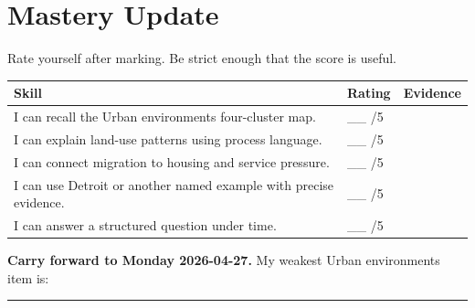 \documentclass[11pt,a4paper]{article}
\begin{document}
\section{Mastery Update}

Rate yourself after marking. Be strict enough that the score is useful.

\begin{tabularx}{\textwidth}{Y L{0.15\textwidth}Y}
\toprule
\textbf{Skill} & \textbf{Rating} & \textbf{Evidence} \\
\midrule
I can recall the Urban environments four-cluster map. & \_\_ /5 & \\
I can explain land-use patterns using process language. & \_\_ /5 & \\
I can connect migration to housing and service pressure. & \_\_ /5 & \\
I can use Detroit or another named example with precise evidence. & \_\_ /5 & \\
I can answer a structured question under time. & \_\_ /5 & \\
\bottomrule
\end{tabularx}

\vspace{0.7em}

\noindent\colorbox{SoftGreen}{%
\begin{minipage}{0.965\textwidth}
\sffamily\raggedright
\textbf{\textcolor{HeadingBlue}{Carry forward to Monday 2026-04-27.}}
My weakest Urban environments item is:
\rule{0.54\textwidth}{0.4pt}
\end{minipage}
}
\end{document}
